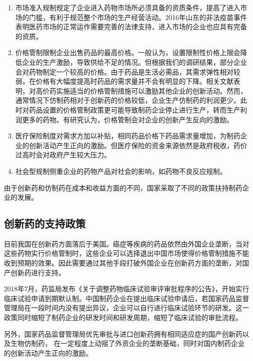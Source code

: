 \documentclass[twocolumn]{ctexbook}
\begin{document}
			
			\begin{enumerate}
				\item 市场准入规制规定了企业进入药物市场所必须具备的资质条件，提高了进入市场的门槛，有利于规范整个市场的生产经营活动。2016年山东的非法疫苗事件表明医药市场的正常运作需要完善的法律支持，进入市场的企业也应具有完备的资质。
				
				\item 价格管制限制企业出售药品的最高价格。一般认为，设置限制性价格上限会降低企业的生产激励，导致供给不足的情况。但根据我们的调研结果，部分企业会对药物制定一个较高的价格。由于药品是生活必需品，其需求弹性相对较弱，在价格有大幅度提高时药品的需求量并不会有明显的下降。相关文献表明，对高价药实施适当的价格管制措施可以激励其他企业的创新活动\citep{RN28}。然而，通常情况下仿制药相对于创新药的价格较低，企业生产仿制药的利润更少。此时对药品设置的价格管制政策更可能导致制药企业停止进行生产，转而生产利润更多的药物。有研究认为，价格管制会对企业的创新产生反向的激励\citep{RN27}。
				
				\item 医疗保险制度对需求方加以补贴，相同药品价格下药品需求量增加，为制药企业的创新活动产生正向的激励。但医疗保险的资金来源依然是政府税收，药价过高时会对政府产生较大压力。
				
				\item 社会型规制侧重企业的药物产品对社会的影响，如药物不良反应规制。
			\end{enumerate}
			
			由于创新药和仿制药在成本和收益方面的不同，国家采取了不同的政策扶持制药企业的发展。
			
			\subsection{创新药的支持政策}
			
			目前我国在创新药方面落后于美国。癌症等疾病的药品依然由外国企业垄断，当对这些药物实行价格管制时，这些企业可以选择退出中国市场使得价格管制措施不能收到预期的效果。因此需要通过其他手段打破外国企业在创新药方面的垄断，对国产创新药进行支持\citep{RN11}。
			
			2018年7月，药监局发布《关于调整药物临床试验审评审批程序的公告》，开始实行临床试验申请到期默认制。中国制药企业在提出临床试验申请后，若国家药品监督管理局在一段时间内没有提出异议，企业可以自行进行临床试验环节的研发。这一政策同时缩短了制药企业的研发时间和研发周期，缩短了临床试验的审批流程。
			
			另外，国家药品监督管理局优先审批与进口创新药拥有相同适应症的国产创新药以及生物仿制药，%
			在一定程度上动摇了外资企业的垄断基础，同时对国内制药企业的创新活动产生正向的激励。
			
\end{document}
